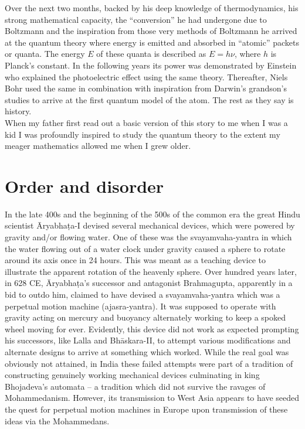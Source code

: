 \documentclass[11pt]{article} %
\numberwithin{equation}{section}
\begin{document}
Over the next two months, backed by his deep knowledge of thermodynamics, his strong mathematical capacity, the “conversion” he had undergone due to Boltzmann and the inspiration from those very methods of Boltzmann he arrived at the quantum theory where energy is emitted and absorbed in “atomic” packets or quanta. The energy $E$ of these quanta is described as $E=h\nu$, where $h$ is Planck’s constant. In the following years its power was demonstrated by Einstein who explained the photoelectric effect using the same theory. Thereafter, Niels Bohr used the same in combination with inspiration from Darwin’s grandson’s studies to arrive at the first quantum model of the atom. The rest as they say is history.\\

When my father first read out a basic version of this story to me when I was a kid I was profoundly inspired to study the quantum theory to the extent my meager mathematics allowed me when I grew older.
 
\section{Order and disorder}
In the late 400s and the beginning of the 500s of the common era the great Hindu scientist Āryabhaṭa-I devised several mechanical devices, which were powered by gravity and/or flowing water. One of these was the svayamvaha-yantra in which the water flowing out of a water clock under gravity caused a sphere to rotate around its axis once in 24 hours. This was meant as a teaching device to illustrate the apparent rotation of the heavenly sphere. Over hundred years later, in 628 CE, Āryabhaṭa’s successor and antagonist Brahmagupta, apparently in a bid to outdo him, claimed to have devised a svayamvaha-yantra which was a perpetual motion machine (ajasra-yantra). It was supposed to operate with gravity acting on mercury and buoyancy alternately working to keep a spoked wheel moving for ever. Evidently, this device did not work as expected prompting his successors, like Lalla and Bhāskara-II, to attempt various modifications and alternate designs to arrive at something which worked. While the real goal was obviously not attained, in India these failed attempts were part of a tradition of constructing genuinely working mechanical devices culminating in king Bhojadeva’s automata -- a tradition which did not survive the ravages of Mohammedanism. However, its transmission to West Asia appears to have seeded the quest for perpetual motion machines in Europe upon transmission of these ideas via the Mohammedans.\\
\end{document}
